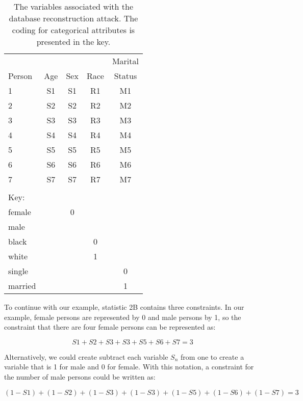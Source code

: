 \documentclass[runningheads]{llncs}
\begin{document}
\begin{center}
\begin{table}
\begin{tabular}{l|cccc}
       &     &     &      & Marital  \\
Person & Age & Sex & Race & Status   \\
\hline                             
1      & S1  & S1  & R1   & M1       \\
2      & S2  & S2  & R2   & M2       \\
3      & S3  & S3  & R3   & M3       \\
4      & S4  & S4  & R4   & M4       \\
5      & S5  & S5  & R5   & M5       \\
6      & S6  & S6  & R6   & M6       \\
7      & S7  & S7  & R7   & M7       \\
\hline
\\
\multicolumn{1}{l}{Key:}\\
\hline
female &     &  0  & \\
male   &     &     & \\
\hline
black  &     &     &  0   & \\
white  &     &     &  1   & \\
\hline
single &     &     &      &   0\\
married&     &     &      &   1\\
\hline
\end{tabular}
\caption{The variables associated with the database reconstruction
  attack. The coding for categorical attributes is presented in the key.}\label{variables}
\end{table}
\end{center}

To continue with our example, statistic 2B contains three
constraints. In our example, female persons
are represented by 0
and male persons by 1, so the constraint that there are four female persons can be represented as:

\begin{equation}\label{eq1}
S1 + S2 + S3 + S3 + S5 + S6 + S7 = 3
\end{equation}

Alternatively, we could create subtract each variable $S_n$ from one
to create a variable that is 1 for male and 0 for female. With this
notation, a constraint for the number of male persons could be written as:

\begin{equation}
(1-S1) + (1-S2) + (1-S3) + (1-S3) + (1-S5) + (1-S6) + (1-S7) = 3
\end{equation}
\end{document}

